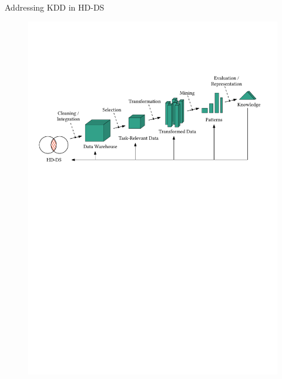 \documentclass[16pt,usenames,dvipsnames, notheorems]{beamer}
\theoremstyle{definition}
\theoremstyle{example}
\theoremstyle{plain}
\begin{document}
\begin{frame}{Addressing KDD in HD-DS}

\begin{figure}
	\begin{overprint}
		 \includegraphics[width=\linewidth]{figures/kdd_bis_1-compressed.pdf}

\end{overprint}
\end{figure}
\end{frame}
\end{document}
